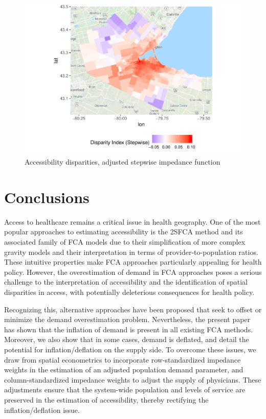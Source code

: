 \documentclass[10pt,letterpaper]{article}
\begin{document}
\begin{figure}
\centering
\includegraphics{Supply_and_Demand_Inflation_in_FCA_Methods_v2.0_files/figure-latex/fig15-map-disparities-stepwise-1.pdf}
\caption{\label{fig:fig15-map-disparities-stepwise}Accessibility
disparities, adjusted stepwise impedance function}
\end{figure}

\section{Conclusions}\label{conclusions}

Access to healthcare remains a critical issue in health geography. One
of the most popular approaches to estimating accessibility is the 2SFCA
method and its associated family of FCA models due to their
simplification of more complex gravity models and their interpretation
in terms of provider-to-population ratios. These intuitive properties
make FCA approaches particularly appealing for health policy. However,
the overestimation of demand in FCA approaches poses a serious challenge
to the interpretation of accessibility and the identification of spatial
disparities in access, with potentially deleterious consequences for
health policy.

Recognizing this, alternative approaches have been proposed that seek to
offset or minimize the demand overestimation problem. Nevertheless, the
present paper has shown that the inflation of demand is present in all
existing FCA methods. Moreover, we also show that in some cases, demand
is deflated, and detail the potential for inflation/deflation on the
supply side. To overcome these issues, we draw from spatial econometrics
to incorporate row-standardized impedance weights in the estimation of
an adjusted population demand parameter, and column-standardized
impedance weights to adjust the supply of physicians. These adjustments
ensure that the system-wide population and levels of service are
preserved in the estimation of accessibility, thereby rectifying the
inflation/deflation issue.
\end{document}

